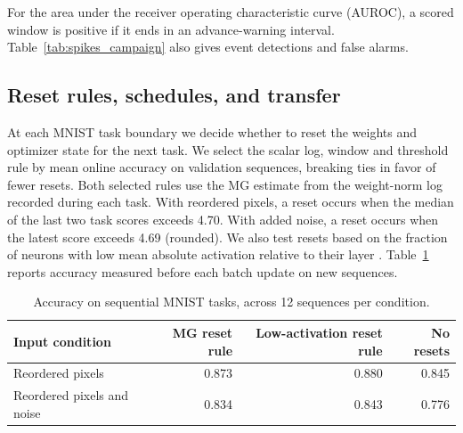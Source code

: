 {For the area under the receiver operating characteristic curve (AUROC), a scored window is positive if it ends in an advance-warning interval. Table~\ref{tab:spikes_campaign} also gives event detections and false alarms.

\begin{table}[!htbp]
\centering\small
\caption{Advance warnings of transformer loss spikes. False alarms are per 10,000 scored updates.}
\label{tab:spikes_campaign}

\end{table}

\subsection{Reset rules, schedules, and transfer}
At each MNIST task boundary we decide whether to reset the weights and optimizer state for the next task. We select the scalar log, window and threshold rule by mean online accuracy on validation sequences, breaking ties in favor of fewer resets. Both selected rules use the MG estimate from the weight-norm log recorded during each task. With reordered pixels, a reset occurs when the median of the last two task scores exceeds 4.70. With added noise, a reset occurs when the latest score exceeds 4.69 (rounded). We also test resets based on the fraction of neurons with low mean absolute activation relative to their layer \citep{sokar2023dormant}. Table~\ref{tab:reset-rules} reports accuracy measured before each batch update on new sequences.

\begin{table}[!htbp]
\centering\small
\caption{Accuracy on sequential MNIST tasks, across 12 sequences per condition.}
\label{tab:reset-rules}
\begin{tabular}{lrrr}
\toprule
Input condition & MG reset rule & Low-activation reset rule & No resets \\
\midrule
Reordered pixels & 0.873 & 0.880 & 0.845 \\
Reordered pixels and noise & 0.834 & 0.843 & 0.776 \\
\bottomrule
\end{tabular}
\end{table}

}
